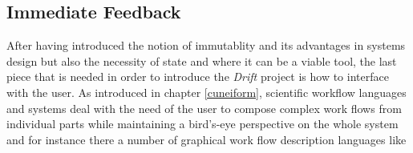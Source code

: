 \subsection{Immediate Feedback}
\label{bretvictor}

After having introduced the notion of immutablity and its advantages
in systems design but also the necessity of state and
where it can be a viable tool, the last piece that is needed in order
to introduce the \textit{Drift} project is how to interface with
the user.
As introduced in chapter \ref{cuneiform}, scientific workflow
languages and systems deal with the need of the user to compose
complex work flows from individual parts while maintaining a
bird's-eye perspective on the whole system and for instance there
a number of graphical work flow description languages like
